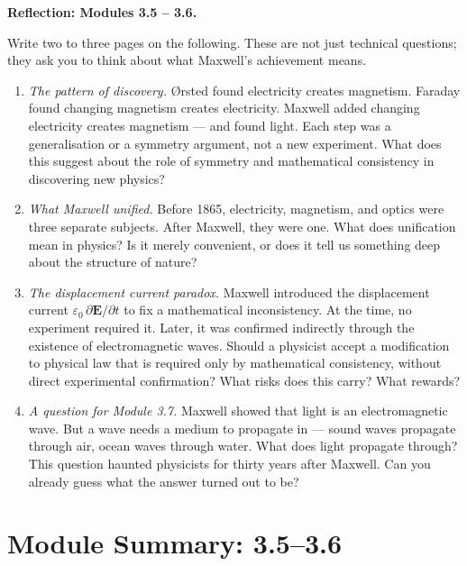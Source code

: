 \documentclass[12pt, a4paper, twoside]{book}
\theoremstyle{disc}
\begin{document}
\begin{reflectionbox}
\textbf{Reflection: Modules 3.5 -- 3.6.}

Write two to three pages on the following. These are not just technical questions; they ask you to think about what Maxwell's achievement means.

\begin{enumerate}[leftmargin=2em, itemsep=6pt]
  \item \textit{The pattern of discovery.} \O{}rsted found electricity creates magnetism. Faraday found changing magnetism creates electricity. Maxwell added changing electricity creates magnetism --- and found light. Each step was a generalisation or a symmetry argument, not a new experiment. What does this suggest about the role of symmetry and mathematical consistency in discovering new physics?

  \item \textit{What Maxwell unified.} Before 1865, electricity, magnetism, and optics were three separate subjects. After Maxwell, they were one. What does unification mean in physics? Is it merely convenient, or does it tell us something deep about the structure of nature?

  \item \textit{The displacement current paradox.} Maxwell introduced the displacement current $\varepsilon_0\,\partial\bm{E}/\partial t$ to fix a mathematical inconsistency. At the time, no experiment required it. Later, it was confirmed indirectly through the existence of electromagnetic waves. Should a physicist accept a modification to physical law that is required only by mathematical consistency, without direct experimental confirmation? What risks does this carry? What rewards?

  \item \textit{A question for Module 3.7.} Maxwell showed that light is an electromagnetic wave. But a wave needs a medium to propagate in --- sound waves propagate through air, ocean waves through water. What does light propagate through? This question haunted physicists for thirty years after Maxwell. Can you already guess what the answer turned out to be?
\end{enumerate}
\end{reflectionbox}

\chapter*{Module Summary: 3.5--3.6}
\end{document}
